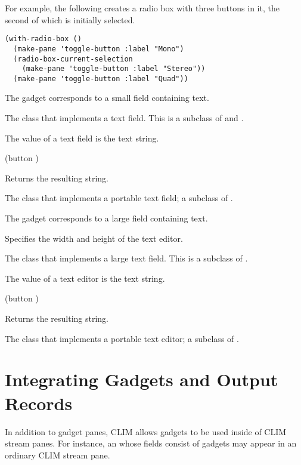 For example, the following creates a radio box with three buttons in it, the
second of which is initially selected.

\begin{verbatim}
(with-radio-box ()
  (make-pane 'toggle-button :label "Mono")
  (radio-box-current-selection
    (make-pane 'toggle-button :label "Stereo"))
  (make-pane 'toggle-button :label "Quad"))
\end{verbatim}



The  gadget corresponds to a small field containing text.


The class that implements a text field.  This is a subclass of 
and .

The value of a text field is the text string.  

 {(button )}

Returns the resulting string.


The class that implements a portable text field; a subclass of .



The  gadget corresponds to a large field containing text.


Specifies the width and height of the text editor.


The class that implements a large text field.  This is a subclass of .

The value of a text editor is the text string.  

 {(button )}

Returns the resulting string.


The class that implements a portable text editor; a subclass of .


\section {Integrating Gadgets and Output Records}

In addition to gadget panes, CLIM allows gadgets to be used inside of CLIM
stream panes.  For instance, an  whose fields consist of
gadgets may appear in an ordinary CLIM stream pane.

